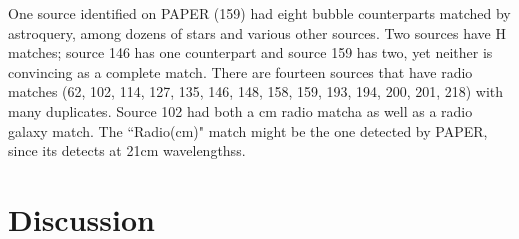 \documentclass[useAMS,usenatbib]{mn2e}
\begin{document}
One source identified on PAPER (159) had eight bubble counterparts matched by astroquery, among dozens of stars and various other sources.  Two  sources have {H} matches; source 146 has one counterpart and source 159 has two, yet neither is convincing as a complete match.  There are fourteen sources that have radio matches (62, 102, 114, 127, 135, 146, 148, 158, 159, 193, 194, 200, 201, 218) with many duplicates.  Source 102 had both a cm radio matcha as well as a radio galaxy match.  The ``Radio(cm)" match might be the one detected by PAPER, since its detects at 21cm wavelengthss.  

\section{Discussion}
\label{sec:disc}
\end{document}
